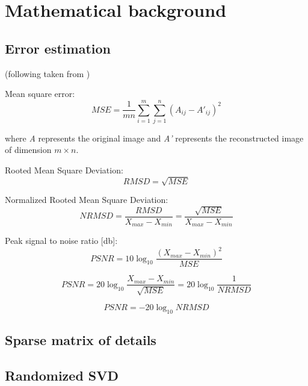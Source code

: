 \section{Mathematical background}
\label{sec:math}



\subsection{Error estimation}
\label{sec:error}


(following taken from \cite{SairaBanu2015})

Mean square error:
\begin{equation}
MSE=\frac{1}{m n} \sum_{i=1}^{m} \sum_{j=1}^{n} (A_{ij} - A'_{ij})^{2}
\label{eq:mse-def}
\end{equation}

where \textit{A} represents the original image and \textit{A'} represents the
reconstructed image of dimension $m \times n$.

Rooted Mean Square Deviation:
\begin{equation}
RMSD=\sqrt{MSE}
\label{eq:rmsd-def}
\end{equation}

Normalized Rooted Mean Square Deviation:
\begin{equation}
NRMSD=\frac{RMSD}{X_{max}-X_{min}}=\frac{\sqrt{MSE}}{X_{max}-X_{min}}
\label{eq:nrmsd-def}
\end{equation}

Peak signal to noise ratio [db]:
\begin{equation}
PSNR=10\log_{10}\frac{(X_{max}-X_{min})^{2}}{MSE}
\end{equation}

\begin{equation}
PSNR=20\log_{10}\frac{X_{max}-X_{min}}{\sqrt{MSE}}=20\log_{10}\frac{1}{NRMSD}
\end{equation}

\begin{equation}
PSNR=-20\log_{10}NRMSD
\label{eq:psnr-def}
\end{equation}

\subsection{Sparse matrix of details}

\subsection{Randomized SVD}
